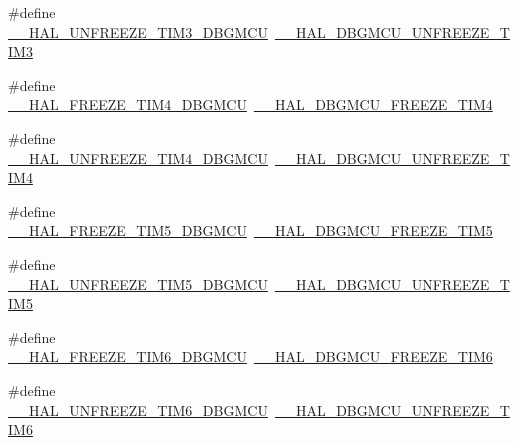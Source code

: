 \begin{DoxyCompactItemize}
\item 
\#define \hyperlink{group___h_a_l___d_b_g_m_c_u___aliased___macros_ga3f10f260e5d0f57927abfaa221852adc}{\+\_\+\+\_\+\+H\+A\+L\+\_\+\+U\+N\+F\+R\+E\+E\+Z\+E\+\_\+\+T\+I\+M3\+\_\+\+D\+B\+G\+M\+CU}~\hyperlink{group___h_a_l___exported___macros_ga5aecefa008a37ef7c6489a2e29415e69}{\+\_\+\+\_\+\+H\+A\+L\+\_\+\+D\+B\+G\+M\+C\+U\+\_\+\+U\+N\+F\+R\+E\+E\+Z\+E\+\_\+\+T\+I\+M3}
\item 
\#define \hyperlink{group___h_a_l___d_b_g_m_c_u___aliased___macros_ga09debeabdcdea1cb332a0de450baba57}{\+\_\+\+\_\+\+H\+A\+L\+\_\+\+F\+R\+E\+E\+Z\+E\+\_\+\+T\+I\+M4\+\_\+\+D\+B\+G\+M\+CU}~\hyperlink{group___h_a_l___exported___macros_ga9ec45e12bbea210d8ec91d9cdd9f911c}{\+\_\+\+\_\+\+H\+A\+L\+\_\+\+D\+B\+G\+M\+C\+U\+\_\+\+F\+R\+E\+E\+Z\+E\+\_\+\+T\+I\+M4}
\item 
\#define \hyperlink{group___h_a_l___d_b_g_m_c_u___aliased___macros_gac8c490bc65df67f5ffd791f98bff8684}{\+\_\+\+\_\+\+H\+A\+L\+\_\+\+U\+N\+F\+R\+E\+E\+Z\+E\+\_\+\+T\+I\+M4\+\_\+\+D\+B\+G\+M\+CU}~\hyperlink{group___h_a_l___exported___macros_gac73202fc9f0913f52ef70c42b6cab287}{\+\_\+\+\_\+\+H\+A\+L\+\_\+\+D\+B\+G\+M\+C\+U\+\_\+\+U\+N\+F\+R\+E\+E\+Z\+E\+\_\+\+T\+I\+M4}
\item 
\#define \hyperlink{group___h_a_l___d_b_g_m_c_u___aliased___macros_ga3fc7dba3ede61d40d034a57ffd69eab5}{\+\_\+\+\_\+\+H\+A\+L\+\_\+\+F\+R\+E\+E\+Z\+E\+\_\+\+T\+I\+M5\+\_\+\+D\+B\+G\+M\+CU}~\hyperlink{group___h_a_l___exported___macros_ga051eca105d8696d54e19fdfc8343a0a2}{\+\_\+\+\_\+\+H\+A\+L\+\_\+\+D\+B\+G\+M\+C\+U\+\_\+\+F\+R\+E\+E\+Z\+E\+\_\+\+T\+I\+M5}
\item 
\#define \hyperlink{group___h_a_l___d_b_g_m_c_u___aliased___macros_gaaf52c2c670e73f52ef844a7f81c1a80d}{\+\_\+\+\_\+\+H\+A\+L\+\_\+\+U\+N\+F\+R\+E\+E\+Z\+E\+\_\+\+T\+I\+M5\+\_\+\+D\+B\+G\+M\+CU}~\hyperlink{group___h_a_l___exported___macros_ga0669527789fb4616ec07ed711a600d04}{\+\_\+\+\_\+\+H\+A\+L\+\_\+\+D\+B\+G\+M\+C\+U\+\_\+\+U\+N\+F\+R\+E\+E\+Z\+E\+\_\+\+T\+I\+M5}
\item 
\#define \hyperlink{group___h_a_l___d_b_g_m_c_u___aliased___macros_gae32a9752e37472f80934c314553a44e5}{\+\_\+\+\_\+\+H\+A\+L\+\_\+\+F\+R\+E\+E\+Z\+E\+\_\+\+T\+I\+M6\+\_\+\+D\+B\+G\+M\+CU}~\hyperlink{group___h_a_l___exported___macros_gaccdcfde9ae6f78f0ca359776b021f87c}{\+\_\+\+\_\+\+H\+A\+L\+\_\+\+D\+B\+G\+M\+C\+U\+\_\+\+F\+R\+E\+E\+Z\+E\+\_\+\+T\+I\+M6}
\item 
\#define \hyperlink{group___h_a_l___d_b_g_m_c_u___aliased___macros_ga2a08c6ac06f114fa3ee71f3105f1ed8a}{\+\_\+\+\_\+\+H\+A\+L\+\_\+\+U\+N\+F\+R\+E\+E\+Z\+E\+\_\+\+T\+I\+M6\+\_\+\+D\+B\+G\+M\+CU}~\hyperlink{group___h_a_l___exported___macros_gaab127b51706a565b72c397e29b145234}{\+\_\+\+\_\+\+H\+A\+L\+\_\+\+D\+B\+G\+M\+C\+U\+\_\+\+U\+N\+F\+R\+E\+E\+Z\+E\+\_\+\+T\+I\+M6}

\end{DoxyCompactItemize}
